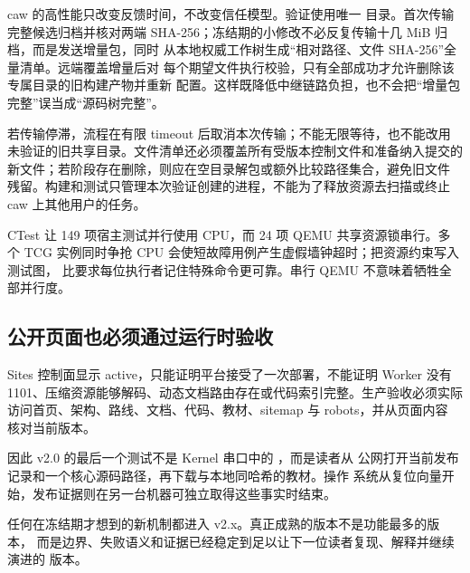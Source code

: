 caw 的高性能只改变反馈时间，不改变信任模型。验证使用唯一
 目录。首次传输完整候选归档并核对两端
SHA-256；冻结期的小修改不必反复传输十几 MiB 归档，而是发送增量包，同时
从本地权威工作树生成“相对路径、文件 SHA-256”全量清单。远端覆盖增量后对
每个期望文件执行校验，只有全部成功才允许删除该专属目录的旧构建产物并重新
配置。这样既降低中继链路负担，也不会把“增量包完整”误当成“源码树完整”。

若传输停滞，流程在有限 timeout 后取消本次传输；不能无限等待，也不能改用
未验证的旧共享目录。文件清单还必须覆盖所有受版本控制文件和准备纳入提交的
新文件；若阶段存在删除，则应在空目录解包或额外比较路径集合，避免旧文件
残留。构建和测试只管理本次验证创建的进程，不能为了释放资源去扫描或终止
caw 上其他用户的任务。

CTest 让 149 项宿主测试并行使用 CPU，而 24 项 QEMU 共享资源锁串行。多个
TCG 实例同时争抢 CPU 会使短故障用例产生虚假墙钟超时；把资源约束写入测试图，
比要求每位执行者记住特殊命令更可靠。串行 QEMU 不意味着牺牲全部并行度。

\subsection{公开页面也必须通过运行时验收}

Sites 控制面显示 active，只能证明平台接受了一次部署，不能证明 Worker 没有
1101、压缩资源能够解码、动态文档路由存在或代码索引完整。生产验收必须实际
访问首页、架构、路线、文档、代码、教材、sitemap 与 robots，并从页面内容
核对当前版本。

因此 v2.0 的最后一个测试不是 Kernel 串口中的 ，而是读者从
公网打开当前发布记录和一个核心源码路径，再下载与本地同哈希的教材。操作
系统从复位向量开始，发布证据则在另一台机器可独立取得这些事实时结束。

任何在冻结期才想到的新机制都进入 v2.x。真正成熟的版本不是功能最多的版本，
而是边界、失败语义和证据已经稳定到足以让下一位读者复现、解释并继续演进的
版本。
